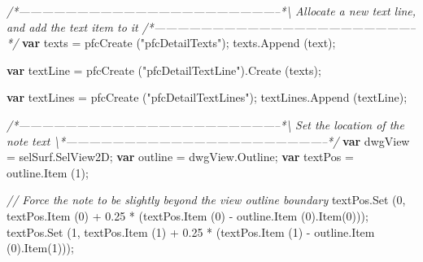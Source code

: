 \documentclass[]{article}
\newenvironment{Shaded}{}{}
\newcommand{\KeywordTok}[1]{\textcolor[rgb]{0.00,0.44,0.13}{\textbf{{#1}}}}
\newcommand{\DecValTok}[1]{\textcolor[rgb]{0.25,0.63,0.44}{{#1}}}
\newcommand{\FloatTok}[1]{\textcolor[rgb]{0.25,0.63,0.44}{{#1}}}
\newcommand{\StringTok}[1]{\textcolor[rgb]{0.25,0.44,0.63}{{#1}}}
\newcommand{\CommentTok}[1]{\textcolor[rgb]{0.38,0.63,0.69}{\textit{{#1}}}}
\newcommand{\OtherTok}[1]{\textcolor[rgb]{0.00,0.44,0.13}{{#1}}}
\newcommand{\FunctionTok}[1]{\textcolor[rgb]{0.02,0.16,0.49}{{#1}}}
\newcommand{\NormalTok}[1]{{#1}}
\begin{document}
\begin{Shaded}
\begin{Highlighting}[]
\CommentTok{/*--------------------------------------------------------------------*\textbackslash{} }
\CommentTok{  Allocate a new text line, and add the text item to it}
\CommentTok{/*--------------------------------------------------------------------*/} 
  \KeywordTok{var} \NormalTok{texts = }\FunctionTok{pfcCreate} \NormalTok{(}\StringTok{"pfcDetailTexts"}\NormalTok{);}
  \OtherTok{texts}\NormalTok{.}\FunctionTok{Append} \NormalTok{(text);}
  
  \KeywordTok{var} \NormalTok{textLine = }\FunctionTok{pfcCreate} \NormalTok{(}\StringTok{"pfcDetailTextLine"}\NormalTok{).}\FunctionTok{Create} \NormalTok{(texts);}
  
  \KeywordTok{var} \NormalTok{textLines = }\FunctionTok{pfcCreate} \NormalTok{(}\StringTok{"pfcDetailTextLines"}\NormalTok{);}
  \OtherTok{textLines}\NormalTok{.}\FunctionTok{Append} \NormalTok{(textLine);}

\CommentTok{/*--------------------------------------------------------------------*\textbackslash{}    }
\CommentTok{  Set the location of the note text }
\CommentTok{\textbackslash{}*--------------------------------------------------------------------*/} 
  \KeywordTok{var} \NormalTok{dwgView = }\OtherTok{selSurf}\NormalTok{.}\FunctionTok{SelView2D}\NormalTok{;}
  \KeywordTok{var} \NormalTok{outline = }\OtherTok{dwgView}\NormalTok{.}\FunctionTok{Outline}\NormalTok{;}
  \KeywordTok{var} \NormalTok{textPos = }\OtherTok{outline}\NormalTok{.}\FunctionTok{Item} \NormalTok{(}\DecValTok{1}\NormalTok{);}
  
  \CommentTok{// Force the note to be slightly beyond the view outline boundary}
 \OtherTok{textPos}\NormalTok{.}\FunctionTok{Set} \NormalTok{(}\DecValTok{0}\NormalTok{, }\OtherTok{textPos}\NormalTok{.}\FunctionTok{Item} \NormalTok{(}\DecValTok{0}\NormalTok{) + }\FloatTok{0.25} \NormalTok{* (}\OtherTok{textPos}\NormalTok{.}\FunctionTok{Item} \NormalTok{(}\DecValTok{0}\NormalTok{) - }
                        \OtherTok{outline}\NormalTok{.}\FunctionTok{Item} \NormalTok{(}\DecValTok{0}\NormalTok{).}\FunctionTok{Item}\NormalTok{(}\DecValTok{0}\NormalTok{)));}
 \OtherTok{textPos}\NormalTok{.}\FunctionTok{Set} \NormalTok{(}\DecValTok{1}\NormalTok{, }\OtherTok{textPos}\NormalTok{.}\FunctionTok{Item} \NormalTok{(}\DecValTok{1}\NormalTok{) + }\FloatTok{0.25} \NormalTok{* (}\OtherTok{textPos}\NormalTok{.}\FunctionTok{Item} \NormalTok{(}\DecValTok{1}\NormalTok{) - }
                        \OtherTok{outline}\NormalTok{.}\FunctionTok{Item} \NormalTok{(}\DecValTok{0}\NormalTok{).}\FunctionTok{Item}\NormalTok{(}\DecValTok{1}\NormalTok{)));}
 

\end{Highlighting}
\end{Shaded}
\end{document}
